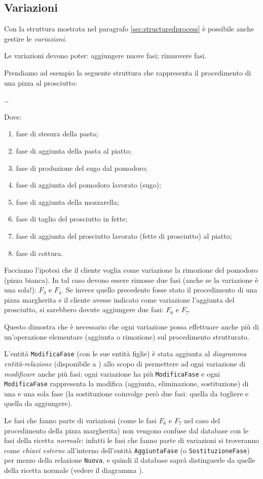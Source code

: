 \subsection{Variazioni}
Con la struttura mostrata nel paragrafo \vref{sec:structuredprocess} è possibile anche
gestire le {\it variazioni}.

Le variazioni devono poter: aggiungere nuove fasi; rimuovere fasi.

Prendiamo ad esempio la seguente struttura che rappresenta il procedimento di una
pizza al prosciutto:

\ldots

Dove:
\begin{enumerate}[label=$F_{\arabic*}$:]
    \item fase di stesura della pasta;
    \item fase di aggiunta della pasta al piatto;
    \item fase di produzione del sugo dal pomodoro;
    \item fase di aggiunta del pomodoro lavorato (sugo);
    \item fase di aggiunta della mozzarella;
    \item fase di taglio del prosciutto in fette;
    \item fase di aggiunta del prosciutto lavorato (fette di prosciutto) al piatto;
    \item fase di cottura.
\end{enumerate}

Facciamo l'ipotesi che il cliente voglia come variazione la rimozione del pomodoro
(pizza bianca). In tal caso devono essere rimosse due fasi (anche se la variazione è
una sola!): $F_{3}$ e $F_{4}$. Se invece quello precedente fosse stato il procedimento
di una pizza margherita e il cliente avesse indicato come variazione l'aggiunta del
prosciutto, si sarebbero dovute aggiungere due fasi: $F_{6}$ e $F_{7}$.

Questo dimostra che è necessario che ogni variazione possa effettuare anche più di un'operazione
elementare (aggiunta o rimozione) sul procedimento strutturato.

L'entità {\tt ModificaFase} (con le sue entità figlie) è stata aggiunta al {\it diagramma
entità-relazione} (disponibile a ) allo scopo di permettere
ad ogni variazione di {\it modificare} anche più fasi: ogni variazione ha più
{\tt ModificaFase} e ogni {\tt ModificaFase} rappresenta la modifica (aggiunta, eliminazione, sostituzione)
di una e una sola fase (la sostituzione coinvolge però due fasi: quella da togliere e quella da aggiungere).

Le fasi che fanno parte di variazioni (come le fasi $F_{6}$ e $F_{7}$ nel caso del procedimento
della pizza margherita) non vengono confuse dal database con le fasi della ricetta {\it normale}:
infatti le fasi che fanno parte di variazioni si troveranno come {\it chiavi esterne}
all'interno dell'entità {\tt AggiuntaFase} (o {\tt SostituzioneFase}) per mezzo della relazione
{\tt Nuova}, e quindi il database saprà distinguerle da quelle della ricetta normale
(vedere il diagramma ).

